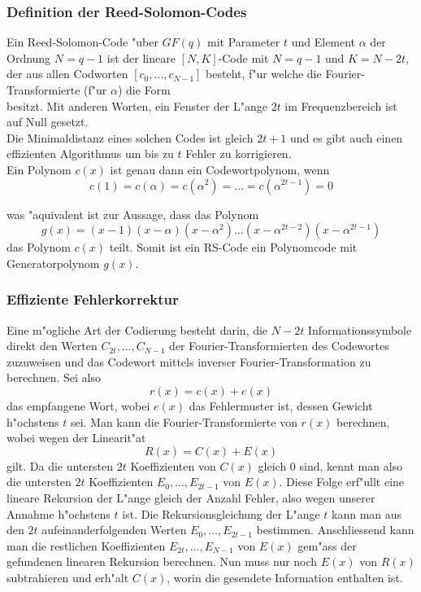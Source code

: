 \documentclass[german, 10pt, a4paper, twocolumn]{scrartcl}
\begin{document}
\subsubsection{Definition der Reed-Solomon-Codes}

Ein Reed-Solomon-Code "uber $GF(q)$ mit Parameter $t$ und Element $\alpha$ der Ordnung $N=q-1$ ist der lineare $[N,K]$-Code mit $N=q-1$ und $K=N-2t$, der aus allen Codworten $[c_0,\ldots,c_{N-1}]$ besteht, f"ur welche die Fourier-Transformierte (f"ur $\alpha$) die Form
\begin{displaymath}
	[\underbrace{0,\ldots,0}_{2t},C_{2t},\ldots,C_{N-1}]
\end{displaymath}
besitzt. Mit anderen Worten, ein Fenster der L"ange $2t$ im Frequenzbereich ist auf Null gesetzt.\\

Die Minimaldistanz eines solchen Codes ist gleich $2t+1$ und es gibt auch einen effizienten Algorithmus um bis zu $t$ Fehler zu korrigieren.\\
Ein Polynom $c(x)$ ist genau dann ein Codewortpolynom, wenn
\begin{displaymath}
	c(1) = c(\alpha) = c(\alpha^2) = \hdots = c(\alpha^{2t-1}) = 0
\end{displaymath}

was "aquivalent ist zur Aussage, dass das Polynom
\begin{displaymath}
	g(x) = (x-1)(x-\alpha)(x-\alpha^2)\hdots(x-\alpha^{2t-2})(x-\alpha^{2t-1})
\end{displaymath}
das Polynom $c(x)$ teilt. Somit ist ein RS-Code ein Polynomcode mit Generatorpolynom $g(x)$.

\subsubsection{Effiziente Fehlerkorrektur}

Eine m"ogliche Art der Codierung besteht darin, die $N-2t$ Informationssymbole direkt den Werten $C_{2t},\ldots,C_{N-1}$ der Fourier-Transformierten des Codewortes zuzuweisen und das Codewort mittels inverser Fourier-Transformation zu berechnen. Sei also
\begin{displaymath}
	r(x) = c(x) + e(x)
\end{displaymath}
das empfangene Wort, wobei $e(x)$ das Fehlermuster ist, dessen Gewicht h"ochstens $t$ sei. Man kann die Fourier-Transformierte von $r(x)$ berechnen, wobei wegen der Linearit"at
\begin{displaymath}
	R(x) = C(x) + E(x)
\end{displaymath}
gilt. Da die untersten $2t$ Koeffizienten von $C(x)$ gleich $0$ sind, kennt man also die untersten $2t$ Koeffizienten $E_0,\ldots,E_{2t-1}$ von $E(x)$. Diese Folge erf"ullt eine lineare Rekursion der L"ange gleich der Anzahl Fehler, also wegen unserer Annahme h"ochstens $t$ ist. Die Rekursionsgleichung der L"ange $t$ kann man aus den $2t$ aufeinanderfolgenden Werten $E_0,\ldots,E_{2t-1}$ bestimmen. Anschliessend kann man die restlichen Koeffizienten $E_{2t},\ldots,E_{N-1}$ von $E(x)$ gem"ass der gefundenen linearen Rekursion berechnen. Nun muss nur noch $E(x)$ von $R(x)$ subtrahieren und erh"alt $C(x)$, worin die gesendete Information enthalten ist.
\end{document}
